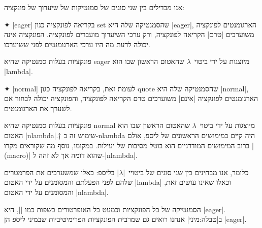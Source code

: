 אנו מבדילים בין שני סוגים של סמנטיקות של שיערוך של פונקציה:
\begin{description}
  ✦ [eager] בקריאה לפונקציה כגון set שהסמנטיקה שלה היא \E|eager|, הארגומנטים
  לפונקציה משוערכים \ע|טרם| הקריאה לפונקציה, ורק ערכי השיערוך מועברים לפונקציה.
  הפונקציה אינה יכולה לדעת מה היו ערכי הארגומנטים לפני ששוערכו.

  פונקציות בעלות סמנטיקה שהיא eager מיוצגות על ידי ביטוי~$λ$ שהאטום הראשון שבו
  הוא \T|lambda|.

  ✦ [normal] לעומת זאת, בקריאה לפונקציה כגון quote שהסמנטיקה שלה היא
  \E|normal|, הארגומנטים לפונקציה \ע|אינם| משוערכים טרם הקריאה לפונקציה,
  והפונקציה יכולה לבחור אם לשערך את הארגומנטים.

  פונקציות בעלות סמנטיקה שהיא normal מיוצגות על ידי ביטוי~$λ$ שהאטום הראשון שבו
  הוא האטום \T|nlambda|.†{%
  שימוש זה ב-nlambda היה קיים במימושים הראשונים של ליספ, אולם ברוב המימושים המודרניים
  הוא בוטל מסיבות של יעילות. במקומו, נוסף מה שקוראים מקרו \E|(macro)|
  שהוא דומה אך לא זהה ל-\E|nlambda|.}

  כלומר, אנו מבחינים בין שני סוגים של ביטויי~\E|$λ$| בליספ: כאלו שמשערכים את
  הפרמטרים שלהם לפני הפעלתם והמסומנים על ידי האטום \T|lambda| וכאלו שאינו עושים
  זאת, והמסומנים על ידי האטום \T|nlambda|.
\end{description}

הסמנטיקה של כל הפונקציות וכמעט כל האופרטורים בשפות כמו \E|\CPL|, היא \E|eager|.
ב|טבלה:מיני| אנחנו רואים גם שמרבית הפונקציות הפרימיטיביות שבמיני ליספ הן
\E|eager|.

